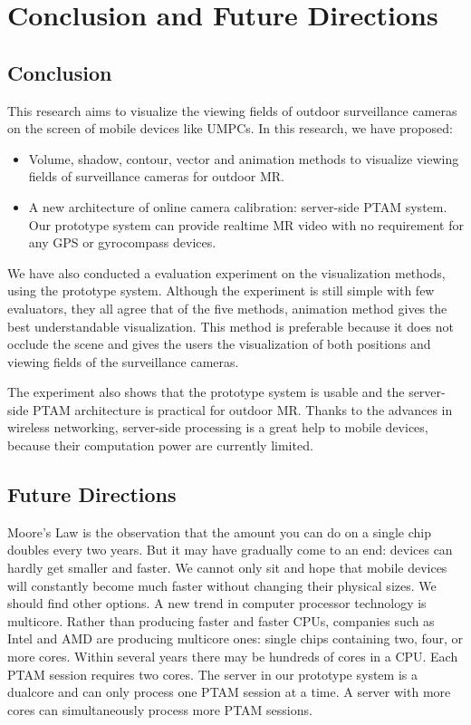 \chapter{Conclusion and Future Directions}
\label{Chapter5}

\section{Conclusion}

This research aims to visualize the viewing fields of outdoor surveillance cameras on the screen of mobile devices like UMPCs. In this research, we have proposed:

\begin{itemize}
	\item Volume, shadow, contour, vector and animation methods to visualize viewing fields of surveillance cameras for outdoor MR.
	\item A new architecture of online camera calibration: server-side PTAM \cite{Reference12} system. Our prototype system can provide realtime MR video with no requirement for any GPS or gyrocompass devices.
\end{itemize}

We have also conducted a evaluation experiment on the visualization methods, using the prototype system. Although the experiment is still simple with few evaluators, they all agree that of the five methods, animation method gives the best understandable visualization. This method is preferable because it does not occlude the scene and gives the users the visualization of both positions and viewing fields of the surveillance cameras.

The experiment also shows that the prototype system is usable and the server-side PTAM architecture is practical for outdoor MR. Thanks to the advances in wireless networking, server-side processing is a great help to mobile devices, because their computation power are currently limited.

\section{Future Directions}

Moore's Law is the observation that the amount you can do on a single chip doubles every two years. But it may have gradually come to an end: devices can hardly get smaller and faster. We cannot only sit and hope that mobile devices will constantly become much faster without changing their physical sizes. We should find other options. A new trend in computer processor technology is multicore. Rather than producing faster and faster CPUs, companies such as Intel and AMD are producing multicore ones: single chips containing two, four, or more cores. Within several years there may be hundreds of cores in a CPU. Each PTAM session requires two cores. The server in our prototype system is a dualcore and can only process one PTAM session at a time. A server with more cores can simultaneously process more PTAM sessions.

